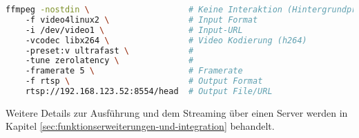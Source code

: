 \begin{lstlisting}[language=Bash]
ffmpeg -nostdin \                    # Keine Interaktion (Hintergrundprozess)
    -f video4linux2 \                # Input Format
    -i /dev/video1 \                 # Input-URL
    -vcodec libx264 \                # Video Kodierung (h264)
    -preset:v ultrafast \            #
    -tune zerolatency \              #
    -framerate 5 \                   # Framerate
    -f rtsp \                        # Output Format
    rtsp://192.168.123.52:8554/head  # Output File/URL
\end{lstlisting}

Weitere Details zur Ausführung und dem Streaming über einen Server werden in Kapitel \ref{sec:funktionserweiterungen-und-integration}
behandelt.